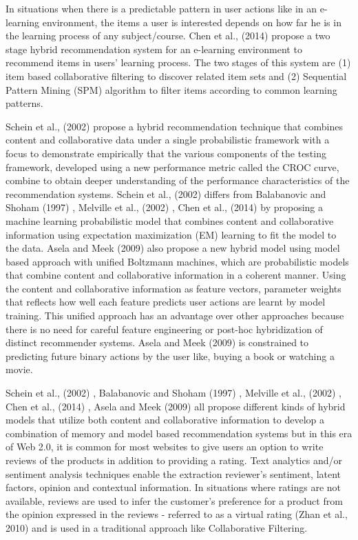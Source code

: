 \documentclass[12pt]{article}
\begin{document}
In situations when there is a predictable pattern in user actions like in an e-learning environment, the items a user is interested depends on how far he is in the learning process of any subject/course. Chen et al., (2014) \cite{chen} propose a two stage hybrid recommendation system for an e-learning environment to recommend items in users' learning process. The two stages of this system are (1) item based collaborative filtering to discover related item sets and (2) Sequential Pattern Mining (SPM) algorithm to filter items according to common learning patterns. 

Schein et al., (2002) \cite{schein} propose a hybrid recommendation technique that combines content and collaborative data under a single probabilistic framework with a focus to demonstrate empirically that the various components of the testing framework, developed using a new performance metric called the CROC curve, combine to obtain deeper understanding of the performance characteristics of the recommendation systems. Schein et al., (2002) \cite{schein} differs from Balabanovic and Shoham (1997) \cite{balabanovic}, Melville et al., (2002) \cite{melville}, Chen et al., (2014) \cite{chen} by proposing a machine learning probabilistic model that combines content and collaborative information using expectation maximization (EM) learning to fit the model to the data. Asela and Meek (2009) \cite{gunawardana} also propose a new hybrid model using model based approach with unified Boltzmann machines, which are probabilistic models that combine content and collaborative information in a coherent manner. Using the content and collaborative information as feature vectors, parameter weights that reflects how well each feature predicts user actions are learnt by model training. This unified approach has an advantage over other approaches because there is no need for careful feature engineering or post-hoc hybridization of distinct recommender systems. Asela and Meek (2009) \cite{gunawardana} is constrained to predicting future binary actions by the user like, buying a book or watching a movie. \ 

Schein et al., (2002) \cite{schein}, Balabanovic and Shoham (1997) \cite{balabanovic}, Melville et al., (2002) \cite{melville}, Chen et al., (2014) \cite{chen}, Asela and Meek (2009) \cite{gunawardana} all propose different kinds of hybrid models that utilize both content and collaborative information to develop a combination of memory and model based recommendation systems but in this era of Web 2.0, it is common for most websites to give users an option to write reviews of the products in addition to providing a rating. Text analytics and/or sentiment analysis techniques enable the extraction reviewer's sentiment, latent factors, opinion and contextual information. In situations where ratings are not available, reviews are used to infer the customer's preference for a product from the opinion expressed in the reviews - referred to as a virtual rating (Zhan et al., 2010) \cite{zhang-narayan} and is used in a traditional approach like Collaborative Filtering. 
\end{document}
